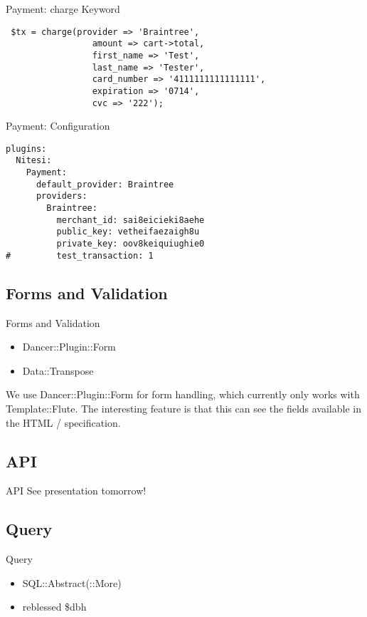 \begin{frame}[fragile]{Payment: charge Keyword}
\begin{lstlisting}
 $tx = charge(provider => 'Braintree',
                 amount => cart->total,
                 first_name => 'Test',
                 last_name => 'Tester',
                 card_number => '4111111111111111',
                 expiration => '0714',
                 cvc => '222');
\end{lstlisting}
\end{frame}

\begin{frame}[fragile]{Payment: Configuration}
\begin{lstlisting}
plugins:
  Nitesi:
    Payment:
      default_provider: Braintree
      providers:
        Braintree:
          merchant_id: sai8eicieki8aehe 
          public_key: vetheifaezaigh8u 
          private_key: oov8keiquiughie0
#         test_transaction: 1
\end{lstlisting}
\end{frame}

\subsection{Forms and Validation}
\begin{frame}{Forms and Validation}
\begin{itemize}
\item Dancer::Plugin::Form
\item Data::Transpose
\end{itemize}
\end{frame}

We use Dancer::Plugin::Form for form handling, which currently
only works with Template::Flute. The interesting feature is
that this can see the fields available in the HTML / specification.

\subsection{API}
\begin{frame}{API}
See presentation tomorrow!
\end{frame}

\subsection{Query}
\begin{frame}{Query}
\begin{itemize}
\item SQL::Abstract(::More)
\item reblessed \$dbh
\end{itemize}
\end{frame}

